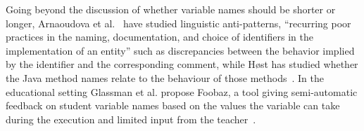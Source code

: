 \documentclass[conference]{IEEEtran}
\newcommand{\quotes}[1]{\textit{``#1''}}
\begin{document}
%
%

Going beyond the discussion of whether variable names should be shorter or longer, Arnaoudova et al.~\cite{ArnaoudovaPAG13,ArnaoudovaPA16} have studied linguistic anti-patterns, ``recurring poor practices in the naming, documentation, and choice of identifiers in the implementation of an entity'' such as discrepancies between the behavior implied by the identifier and the corresponding comment, while H{\o}st has studied whether the Java method names relate to the behaviour of those methods~\cite{Host11}.
In the educational setting Glassman et al. propose Foobaz, a tool giving semi-automatic feedback on student variable names based on the values the variable can take during the execution and limited input from the teacher~\cite{Glassman}.
\end{document}
